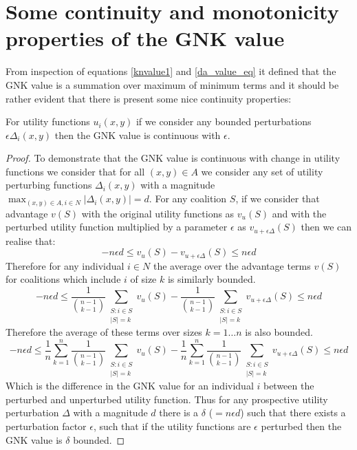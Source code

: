 


\section{Some continuity and monotonicity properties of the GNK value}\label{appendix:continuity_of_GNK}

From inspection of equations \ref{knvalue1} and \ref{da_value_eq} it defined that the GNK value is a summation over maximum of minimum terms and it should be rather evident that there is present some nice continuity properties:

\begin{theorem}
For utility functions $u_i(x,y)$ if we consider any bounded perturbations $\epsilon \Delta_i(x,y)$ then the GNK value is continuous with $\epsilon$.
\end{theorem}
\begin{proof}
To demonstrate that the GNK value is continuous with change in utility functions we consider that for all $(x,y)\in A$ we consider any set of utility perturbing functions $\Delta_i(x,y)$ with a magnitude $\max_{(x,y)\in A, i\in N}|\Delta_i(x,y)| = d$.
For any coalition $S$, if we consider that advantage $v(S)$ with the original utility functions as $v_u(S)$ and with the perturbed utility function multiplied by a parameter $\epsilon$ as $v_{u+\epsilon \Delta}(S)$ then we can realise that:
$$-n\epsilon d \le v_u(S)-v_{u+\epsilon \Delta}(S) \le n\epsilon d$$
Therefore for any individual $i\in N$ the average over the advantage terms $v(S)$ for coalitions which include $i$ of size $k$ is similarly bounded.
$$-n\epsilon d \le \frac{1}{\binom{n-1}{k-1}} \sum_{\substack{S:i\in S \\ |S|=k}}v_u(S)-\frac{1}{\binom{n-1}{k-1}} \sum_{\substack{S:i\in S \\ |S|=k}}v_{u+\epsilon \Delta}(S) \le n\epsilon d$$
Therefore the average of these terms over sizes $k=1\dots n$ is also bounded.
$$-n\epsilon d \le \frac{1}{n}\sum_{k=1}^n \frac{1}{\binom{n-1}{k-1}} \sum_{\substack{S:i\in S \\ |S|=k}}v_u(S)-\frac{1}{n}\sum_{k=1}^n \frac{1}{\binom{n-1}{k-1}} \sum_{\substack{S:i\in S \\ |S|=k}}v_{u+\epsilon \Delta}(S) \le n\epsilon d$$
Which is the difference in the GNK value for an individual $i$ between the perturbed and unperturbed utility function.
Thus for any prospective utility perturbation $\Delta$ with a magnitude $d$ there is a $\delta$ ($=n\epsilon d$) such that there exists a perturbation factor $\epsilon$, such that if the utility functions are $\epsilon$ perturbed then the GNK value is $\delta$ bounded.
\end{proof}

